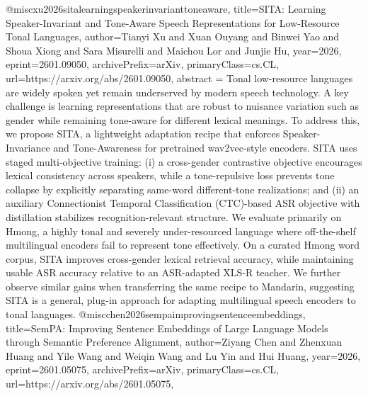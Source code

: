 {}@misc{xu2026sitalearningspeakerinvarianttoneaware,
      title={SITA: Learning Speaker-Invariant and Tone-Aware Speech Representations for Low-Resource Tonal Languages}, 
      author={Tianyi Xu and Xuan Ouyang and Binwei Yao and Shoua Xiong and Sara Misurelli and Maichou Lor and Junjie Hu},
      year={2026},
      eprint={2601.09050},
      archivePrefix={arXiv},
      primaryClass={cs.CL},
      url={https://arxiv.org/abs/2601.09050},
      abstract = {Tonal low-resource languages are widely spoken yet remain underserved by modern speech technology. A key challenge is learning representations that are robust to nuisance variation such as gender while remaining tone-aware for different lexical meanings. To address this, we propose SITA, a lightweight adaptation recipe that enforces Speaker-Invariance and Tone-Awareness for pretrained wav2vec-style encoders. SITA uses staged multi-objective training: (i) a cross-gender contrastive objective encourages lexical consistency across speakers, while a tone-repulsive loss prevents tone collapse by explicitly separating same-word different-tone realizations; and (ii) an auxiliary Connectionist Temporal Classification (CTC)-based ASR objective with distillation stabilizes recognition-relevant structure. We evaluate primarily on Hmong, a highly tonal and severely under-resourced language where off-the-shelf multilingual encoders fail to represent tone effectively. On a curated Hmong word corpus, SITA improves cross-gender lexical retrieval accuracy, while maintaining usable ASR accuracy relative to an ASR-adapted XLS-R teacher. We further observe similar gains when transferring the same recipe to Mandarin, suggesting SITA is a general, plug-in approach for adapting multilingual speech encoders to tonal languages.}
}@misc{chen2026sempaimprovingsentenceembeddings,
      title={SemPA: Improving Sentence Embeddings of Large Language Models through Semantic Preference Alignment}, 
      author={Ziyang Chen and Zhenxuan Huang and Yile Wang and Weiqin Wang and Lu Yin and Hui Huang},
      year={2026},
      eprint={2601.05075},
      archivePrefix={arXiv},
      primaryClass={cs.CL},
      url={https://arxiv.org/abs/2601.05075},
}
